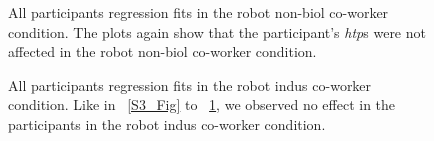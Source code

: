 \begin{figure}
	\caption{All participants regression fits in the robot non-biol co-worker condition. The plots again show that the participant's {\it htp}s were not affected in the robot non-biol co-worker condition.}
\label{S5_Fig}
\end{figure}


\begin{figure}
	\caption{All participants regression fits in the robot indus co-worker condition. Like in ~\ref{S3_Fig} to ~\ref{S5_Fig}, we observed no effect in the participants in the robot indus co-worker condition.}
	\label{S6_Fig}
\end{figure}
